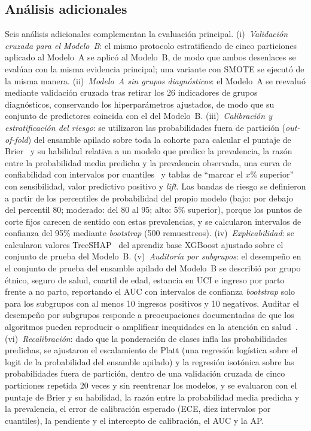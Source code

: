 \documentclass[healthcare,article,submit,pdftex,moreauthors]{Definitions/mdpi_es}
\begin{document}
\subsection{Análisis adicionales}\label{sec:additional}
Seis análisis adicionales complementan la evaluación principal.
(i)~\emph{Validación cruzada para el Modelo~B}: el mismo protocolo estratificado de cinco
particiones aplicado al Modelo~A se aplicó al Modelo~B, de modo que ambos desenlaces se evalúan con
la misma evidencia principal; una variante con SMOTE se ejecutó de la misma manera.
(ii)~\emph{Modelo~A sin grupos diagnósticos}: el Modelo~A se reevaluó mediante validación cruzada
tras retirar los 26 indicadores de grupos diagnósticos, conservando los hiperparámetros ajustados,
de modo que su conjunto de predictores coincida con el del Modelo~B.
(iii)~\emph{Calibración y estratificación del riesgo}: se utilizaron las probabilidades fuera de
partición (\emph{out-of-fold}) del ensamble apilado sobre toda la cohorte para calcular el puntaje de Brier~\cite{Brier1950} y su habilidad relativa a un modelo que predice la prevalencia, la razón entre la probabilidad
media predicha y la prevalencia observada, una curva de confiabilidad con intervalos por cuantiles~\cite{VanCalster2019Calibration,Guo2017Calibration} y
tablas de ``marcar el $x$\% superior'' con sensibilidad, valor predictivo positivo y \emph{lift}. Las
bandas de riesgo se definieron a partir de los percentiles de probabilidad del propio modelo (bajo:
por debajo del percentil 80; moderado: del 80 al 95; alto: 5\% superior), porque los puntos de corte
fijos carecen de sentido con estas prevalencias, y se calcularon intervalos de confianza del 95\%
mediante \emph{bootstrap} (500 remuestreos).
(iv)~\emph{Explicabilidad}: se calcularon valores TreeSHAP~\cite{Lundberg2017SHAP,Lundberg2020TreeSHAP} del aprendiz base XGBoost ajustado sobre
el conjunto de prueba del Modelo~B.
(v)~\emph{Auditoría por subgrupos}: el desempeño en el conjunto de prueba del ensamble apilado del
Modelo~B se describió por grupo étnico, seguro de salud, cuartil de edad, estancia en UCI e ingreso por
parto frente a no parto, reportando el AUC con intervalos de confianza \emph{bootstrap} solo para los
subgrupos con al menos 10 ingresos positivos y 10 negativos. Auditar el desempeño por subgrupos responde a preocupaciones documentadas de que los algoritmos pueden reproducir o amplificar inequidades en la atención en salud~\cite{Obermeyer2019Bias,Rajkomar2018Fairness}.
(vi)~\emph{Recalibración}: dado que la ponderación de clases infla las probabilidades predichas, se ajustaron el escalamiento de Platt (una regresión logística sobre el logit de la probabilidad del ensamble apilado) y la regresión isotónica sobre las probabilidades fuera de partición, dentro de una validación cruzada de cinco particiones repetida 20 veces y sin reentrenar los modelos, y se evaluaron con el puntaje de Brier y su habilidad, la razón entre la probabilidad media predicha y la prevalencia, el error de calibración esperado (ECE, diez intervalos por cuantiles), la pendiente y el intercepto de calibración, el AUC y la AP.
\end{document}
